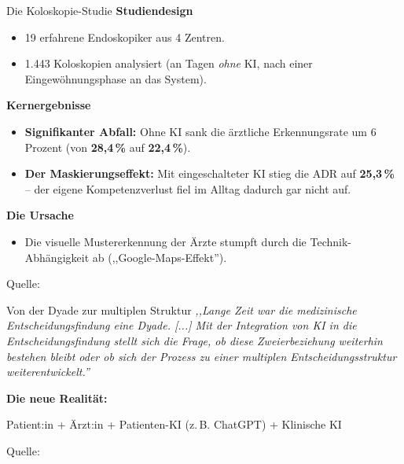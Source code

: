 \documentclass[aspectratio=169]{beamer}
\begin{document}
\begin{frame}{Die Koloskopie-Studie}
    \textbf{Studiendesign}
    \begin{itemize}
        \item 19 erfahrene Endoskopiker aus 4 Zentren.
        \item 1.443 Koloskopien analysiert (an Tagen \textit{ohne} KI, nach einer Eingewöhnungsphase an das System).
    \end{itemize}

    \vspace{0.4cm}
    \textbf{Kernergebnisse }
    \begin{itemize}
        \item \textbf{Signifikanter Abfall:} Ohne KI sank die ärztliche Erkennungsrate um 6 Prozent (von \textbf{28,4\,\%} auf \textbf{22,4\,\%}).
        \item \textbf{Der Maskierungseffekt:} Mit eingeschalteter KI stieg die ADR auf \textbf{25,3\,\%} -- der eigene Kompetenzverlust fiel im Alltag dadurch gar nicht auf.
    \end{itemize}

    \vspace{0.4cm}
    \textbf{Die Ursache}
    \begin{itemize}
        \item Die visuelle Mustererkennung der Ärzte stumpft durch die Technik-Abhängigkeit ab (,,Google-Maps-Effekt'').
    \end{itemize}

    \vfill
    {\tiny Quelle: }
\end{frame}

\begin{frame}{Von der Dyade zur multiplen Struktur}
    \textit{,,Lange Zeit war die medizinische Entscheidungsfindung eine Dyade. [...] Mit der Integration von KI in die Entscheidungsfindung stellt sich die Frage, ob diese Zweierbeziehung weiterhin bestehen bleibt oder ob sich der Prozess zu einer multiplen Entscheidungsstruktur weiterentwickelt.''} \parencite{roche2025}
    
    \vspace{0.4cm}
    \textbf{Die neue Realität:}
    \begin{center}
        Patient:in + Ärzt:in + Patienten-KI (z.\,B. ChatGPT) + Klinische KI
    \end{center}

    \vfill
    {\tiny Quelle: }
\end{frame}
\end{document}
